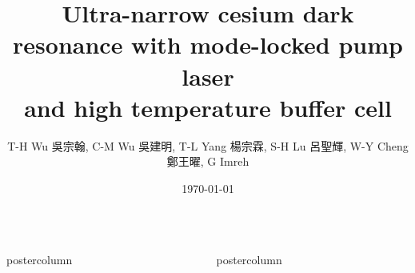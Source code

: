\documentclass[CJKutf8,hyperref={pdfpagelabels=false,unicode}]{beamer}
\title{\huge Ultra-narrow cesium dark resonance with mode-locked pump laser\\ and high temperature buffer cell}
\author{\begin{TChinese}T-H Wu 吳宗翰, C-M Wu 吳建明, T-L Yang 楊宗霖, S-H Lu 呂聖輝, W-Y Cheng 鄭王曜, G Imreh\end{TChinese}}
\institute[IAMS, Academia Sinica]{Institute of Atomic and Molecular Sciences, Academia Sinica, Taiwan}
\date{\today}
\newlength{\columnheight}
\begin{document}
\begin{frame}

  \begin{columns}
    \begin{column}{.49\textwidth}
      \begin{beamercolorbox}[center,wd=\textwidth]{postercolumn}
        \begin{minipage}[T]{.95\textwidth}
          \parbox[t][\columnheight]{\textwidth}{

            


            \vfill
            

            \vfill
            

          }
        \end{minipage}
      \end{beamercolorbox}
    \end{column}
    \begin{column}{.49\textwidth}
      \begin{beamercolorbox}[center,wd=\textwidth]{postercolumn}
        \begin{minipage}[T]{.95\textwidth}
          \parbox[t][\columnheight]{\textwidth}{

            

            \vfill
            

            \vfill
            
          }
        \end{minipage}
      \end{beamercolorbox}
    \end{column}
  \end{columns}
\end{frame}
\end{document}

